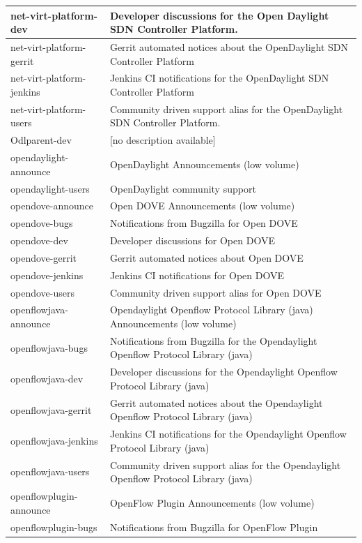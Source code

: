\documentclass[a4paper, 12pt]{book}
\begin{document}
{\begin{longtable}{|p{4cm}|p{10cm}|}
net-virt-platform-dev &	Developer discussions for the Open Daylight SDN Controller Platform. \\ \hline
net-virt-platform-gerrit &	Gerrit automated notices about the OpenDaylight SDN Controller Platform \\ \hline
net-virt-platform-jenkins &	Jenkins CI notifications for the OpenDaylight SDN Controller Platform \\ \hline
net-virt-platform-users &	Community driven support alias for the OpenDaylight SDN Controller Platform. \\ \hline
Odlparent-dev &	[no description available] \\ \hline
opendaylight-announce &	OpenDaylight Announcements (low volume) \\ \hline
opendaylight-users &	OpenDaylight community support \\ \hline
opendove-announce &	Open DOVE Announcements (low volume) \\ \hline
opendove-bugs &	Notifications from Bugzilla for Open DOVE \\ \hline
opendove-dev &	Developer discussions for Open DOVE \\ \hline
opendove-gerrit &	Gerrit automated notices about Open DOVE \\ \hline
opendove-jenkins &	Jenkins CI notifications for Open DOVE \\ \hline
opendove-users &	Community driven support alias for Open DOVE \\ \hline
openflowjava-announce &	Opendaylight Openflow Protocol Library (java) Announcements (low volume) \\ \hline
openflowjava-bugs &	Notifications from Bugzilla for the Opendaylight Openflow Protocol Library (java) \\ \hline
openflowjava-dev &	Developer discussions for the Opendaylight Openflow Protocol Library (java) \\ \hline
openflowjava-gerrit &	Gerrit automated notices about the Opendaylight Openflow Protocol Library (java) \\ \hline
openflowjava-jenkins &	Jenkins CI notifications for the Opendaylight Openflow Protocol Library (java) \\ \hline
openflowjava-users &	Community driven support alias for the Opendaylight Openflow Protocol Library (java) \\ \hline
openflowplugin-announce &	OpenFlow Plugin Announcements (low volume) \\ \hline
openflowplugin-bugs &	Notifications from Bugzilla for OpenFlow Plugin \\ \hline

\end{longtable}}
\end{document}
